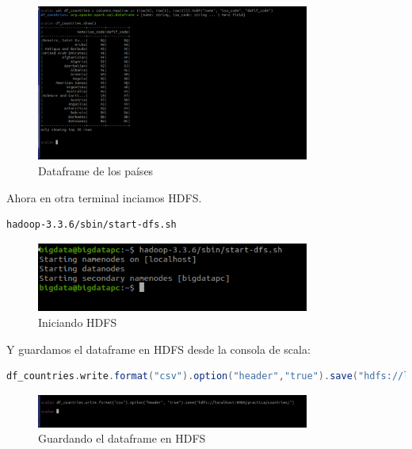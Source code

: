 \begin{figure}[H]
    \centering
    \includegraphics[width=0.8\textwidth]{figures/28.png}
    \caption{Dataframe de los países}
    \label{fig:countries_df}
\end{figure}

Ahora en otra terminal inciamos HDFS.

\begin{lstlisting}[language=bash]
hadoop-3.3.6/sbin/start-dfs.sh
\end{lstlisting}

\begin{figure}[H]
    \centering
    \includegraphics[width=0.8\textwidth]{figures/29.png}
    \caption{Iniciando HDFS}
    \label{fig:start_hdfs}
\end{figure}

Y guardamos el dataframe en HDFS desde la consola de scala:

\begin{lstlisting}[language=scala]
df_countries.write.format("csv").option("header","true").save("hdfs://localhost:9000/practica/countries/")
\end{lstlisting}

\begin{figure}[H]
    \centering
    \includegraphics[width=0.8\textwidth]{figures/30.png}
    \caption{Guardando el dataframe en HDFS}
    \label{fig:save_df}
\end{figure}

